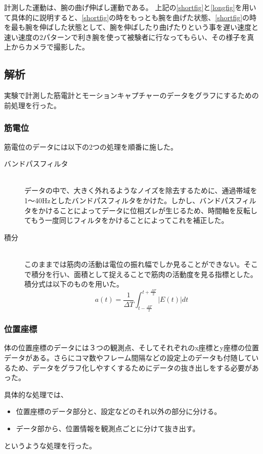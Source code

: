 \documentclass{jsarticle}
\begin{document}
計測した運動は、腕の曲げ伸ばし運動である。
上記の\ref{shortfig}と\ref{longfig}を用いて具体的に説明すると、\ref{shortfig}の時をもっとも腕を曲げた状態、\ref{shortfig}の時を最も腕を伸ばした状態として、腕を伸ばしたり曲げたりという事を遅い速度と速い速度の2パターンで利き腕を使って被験者に行なってもらい、その様子を真上からカメラで撮影した。

\subsection{解析}
実験で計測した筋電計とモーションキャプチャーのデータをグラフにするための前処理を行った。

\subsubsection{筋電位}
筋電位のデータには以下の2つの処理を順番に施した。
\begin{description}
\item[バンドパスフィルタ]\mbox{}\\
  データの中で、大きく外れるようなノイズを除去するために、通過帯域を1〜40Hzとしたバンドパスフィルタをかけた。しかし、バンドパスフィルタをかけることによってデータに位相ズレが生じるため、時間軸を反転してもう一度同じフィルタをかけることによってこれを補正した。
\item[積分]\mbox{}\\
  このままでは筋肉の活動は電位の振れ幅でしか見ることができない。そこで積分を行い、面積として捉えることで筋肉の活動度を見る指標とした。積分式は以下のものを用いた。
  \begin{equation}
    a(t) = \frac{1}{\Delta T} \int_{t-\frac{\Delta T}{2}}^{t+\frac{\Delta T}{2}} |E(t)| dt
  \end{equation}
\end{description}

\subsubsection{位置座標}
体の位置座標のデータには３つの観測点、そしてそれぞれのx座標とy座標の位置データがある。さらにコマ数やフレーム間隔などの設定上のデータも付随しているため、データをグラフ化しやすくするためにデータの抜き出しをする必要があった。

具体的な処理では、
\begin{itemize}
\item 位置座標のデータ部分と、設定などのそれ以外の部分に分ける。
\item データ部から、位置情報を観測点ごとに分けて抜き出す。
\end{itemize}
というような処理を行った。
\newpage
\end{document}
